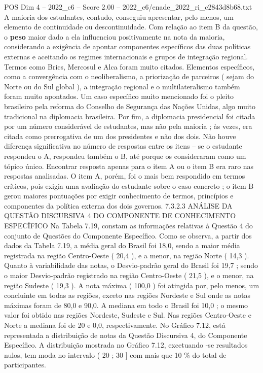 \begin{textsample}{POS Dim 4 – 2022\_c6 – Score 2.00 – 2022\_c6/enade\_2022\_ri\_c2843d8b68.txt}
A maioria dos estudantes, contudo, conseguiu apresentar, pelo menos, um elemento de continuidade ou descontinuidade.
Com relação ao item B da questão, o \textbf{peso} maior dado a ela influenciou positivamente na nota da maioria, considerando a exigência de apontar componentes específicos das duas políticas externas e aceitando os regimes internacionais e grupos de integração regional.
Termos como Brics, Mercosul e Alca foram muito citados.
Elementos específicos, como a convergência com o neoliberalismo, a priorização de parceiros ( sejam do Norte ou do Sul global ), a integração regional e o multilateralismo também foram muito apontados.
Um caso específico muito mencionado foi o pleito brasileiro pela reforma do Conselho de Segurança das Nações Unidas, algo muito tradicional na diplomacia brasileira.
Por fim, a diplomacia presidencial foi citada por um número considerável de estudantes, mas não pela maioria ; às vezes, era citada como prerrogativa de um dos presidentes e não dos dois.
Não houve diferença significativa no número de respostas entre os itens – se o estudante respondeu o A, respondeu também o B, até porque os consideraram como um tópico único.
Encontrar resposta apenas para o item A ou o item B era raro nas respostas analisadas.
O item A, porém, foi o mais bem respondido em termos críticos, pois exigia uma avaliação do estudante sobre o caso concreto ; o item B gerou maiores pontuações por exigir conhecimento de termos, princípios e componentes da política externa dos dois governos. 7.3.2.3 ANÁLISE DA QUESTÃO DISCURSIVA 4 DO COMPONENTE DE CONHECIMENTO ESPECÍFICO Na Tabela 7.19, constam as informações relativas à Questão 4 do conjunto de Questões do Componente Específico.
Como se observa, a partir dos dados da Tabela 7.19, a média geral do Brasil foi 18,0, sendo a maior média registrada na região Centro-Oeste ( 20,4 ), e a menor, na região Norte ( 14,3 ).
Quanto à variabilidade das notas, o Desvio-padrão geral do Brasil foi 19,7 ; sendo o maior Desvio-padrão registrado na região Centro-Oeste ( 21,5 ), e o menor, na região Sudeste ( 19,3 ).
A nota máxima ( 100,0 ) foi atingida por, pelo menos, um concluinte em todas as regiões, exceto nas regiões Nordeste e Sul onde as notas máximas foram de 80,0 e 90,0.
A mediana em todo o Brasil foi 10,0 ; o mesmo valor foi obtido nas regiões Nordeste, Sudeste e Sul.
Nas regiões Centro-Oeste e Norte a mediana foi de 20 e 0,0, respectivamente.
No Gráfico 7.12, está representada a distribuição de notas da Questão Discursiva 4, do Componente Específico.
A distribuição mostrada no Gráfico 7.12, excetuando -se resultados nulos, tem moda no intervalo ( 20 ; 30 ] com mais que 10 \% do total de participantes.

\end{textsample}
